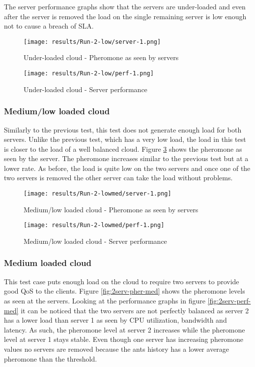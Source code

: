 The server performance graphs show that the servers are under-loaded and even after the server is removed the load on the single remaining server is low enough not to cause a breach of SLA.

\begin{figure}
	\centering
		\texttt{[image: results/Run-2-low/server-1.png]}
	\caption{Under-loaded cloud - Pheromone as seen by servers}
	\label{fig:2serv-pher-low}
\end{figure}

\begin{figure}
	\centering
		\texttt{[image: results/Run-2-low/perf-1.png]}
	\caption{Under-loaded cloud - Server performance}
	\label{fig:2serv-perf-low}
\end{figure}

\subsubsection{Medium/low loaded cloud}

Similarly to the previous test, this test does not generate enough load for both servers. Unlike the previous test, which has a very low load, the load in this test is closer to the load of a well balanced cloud. Figure \ref{fig:2serv-pher-medlow} shows the pheromone as seen by the server. The pheromone increases similar to the previous test but at a lower rate. As before, the load is quite low on the two servers and once one of the two servers is removed the other server can take the load without problems.

\begin{figure}
	\centering
		\texttt{[image: results/Run-2-lowmed/server-1.png]}
	\caption{Medium/low loaded cloud - Pheromone as seen by servers}
	\label{fig:2serv-pher-medlow}
\end{figure}

\begin{figure}
	\centering
		\texttt{[image: results/Run-2-lowmed/perf-1.png]}
	\caption{Medium/low loaded cloud - Server performance}
	\label{fig:2serv-perf-medlow}
\end{figure}

\subsubsection{Medium loaded cloud}

This test case puts enough load on the cloud to require two servers to provide good QoS to the clients. Figure \ref{fig:2serv-pher-med} shows the pheromone levels as seen at the servers. Looking at the performance graphs in figure \ref{fig:2serv-perf-med} it can be noticed that the two servers are not perfectly balanced as server 2 has a lower load than server 1 as seen by CPU utilization, bandwidth and latency. As such, the pheromone level at server 2 increases while the pheromone level at server 1 stays stable. Even though one server has increasing pheromone values no servers are removed because the ants history has a lower average pheromone than the threshold.

